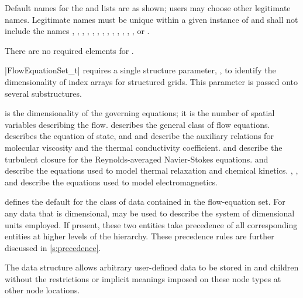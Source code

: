 \begin{notes}
\item Default names for the  and
       lists are as shown; users may choose
      other legitimate names.
      Legitimate names must be unique within a given instance of
       and shall not include the names
      , ,
      , ,
      , , ,
      , ,
      , ,
      , , or
      .
\item There are no required elements for .
\end{notes}

|FlowEquationSet_t| requires a single structure parameter,
, to identify the dimensionality of index arrays for
structured grids.
This parameter is passed onto several substructures.

 is the dimensionality of the governing
equations; it is the number of spatial variables describing the flow.
 describes the general class of flow equations.
 describes the equation of state, and
 and  describe the
auxiliary relations for molecular viscosity and the thermal conductivity
coefficient.
 and  describe the
turbulent closure for the Reynolds-aver\-aged Navier-Stokes equations.
 and  describe
the equations used to model thermal relaxation and chemical kinetics.
, , and
 describe the equations used to model
electromagnetics.

 defines the default for the class of data contained in
the flow-equation set.
For any data that is dimensional,  may be used to
describe the system of dimensional units employed.
If present, these two entities take precedence of all corresponding
entities at higher levels of the hierarchy.
These precedence rules are further discussed in \autoref{s:precedence}.

The  data structure allows arbitrary
user-defined data to be stored in  and
 children without the restrictions or implicit
meanings imposed on these node types at other node locations.


